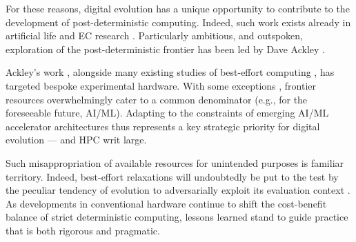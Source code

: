 For these reasons, digital evolution has a unique opportunity to contribute to the development of post-deterministic computing.
Indeed, such work exists already in artificial life \cite{ray1995proposal,moreno2021exploring} and EC research \cite{izzo2009parallel,harada2022frequency,liang2024asynchronous}.
Particularly ambitious, and outspoken, exploration of the post-deterministic frontier has been led by Dave Ackley \cite{ackley2014indefinitely}.

Ackley's work \cite{Ackley2023,ganapati2009modular}, alongside many existing studies of best-effort computing \cite{chippa2014scalable,ackley2011homeostatic,cho2012ersa,chakrapani2008probabilistic,rhodes2020real}, has targeted bespoke experimental hardware.
With some exceptions \cite{mayr2019spinnaker210million,pehle2022brainscales}, frontier resources overwhelmingly cater to a common denominator (e.g., for the foreseeable future, AI/ML).
Adapting to the constraints of emerging AI/ML accelerator architectures thus represents a key strategic priority for digital evolution --- and HPC writ large.

Such misappropriation of available resources for unintended purposes is familiar territory.
Indeed, best-effort relaxations will undoubtedly be put to the test by the peculiar tendency of evolution to adversarially exploit its evaluation context \cite{Thompson1997,Lehman2020}.
As developments in conventional hardware continue to shift the cost-benefit balance of strict deterministic computing, lessons learned stand to guide practice that is both rigorous and pragmatic.



